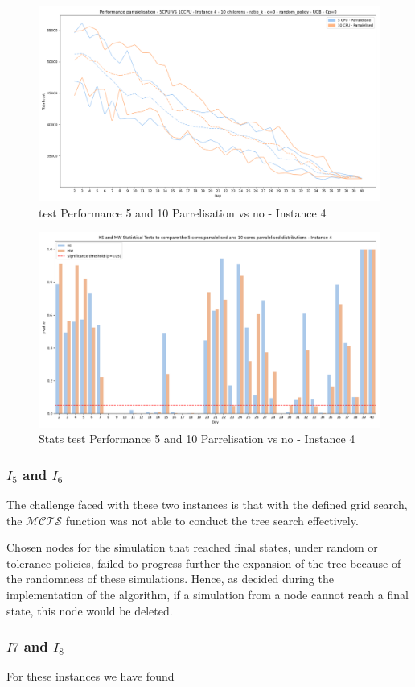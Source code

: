 \begin{figure}[!ht]
    \centering
    \includegraphics[width=\textwidth]{Figures/4 - 5 CPU Paralelised vs 10 CPU paralelised.png}
    \caption{test Performance 5 and 10 Parrelisation vs no - Instance 4}
    \label{fig:parralel (5 vs 10)}
\end{figure}


\begin{figure}[!ht]
    \centering
    \includegraphics[width=\textwidth]{Figures/4 - Distribution stats tests 5P vs 10P.png}
    \caption{Stats test Performance 5 and 10 Parrelisation vs no - Instance 4}
    \label{fig:Stats test 5 VS 10 Parall}
\end{figure}

\newpage
\subsubsection{$I_5$ and $I_6$}

The challenge faced with these two instances is that with the defined grid search, the $\mathcal{MCTS}$ function was not able to conduct the tree search effectively.

Chosen nodes for the simulation that reached final states, under random or tolerance policies, failed to progress further the expansion of the tree because of the randomness of these simulations. Hence, as decided during the implementation of the algorithm, if a simulation from a node cannot reach a final state, this node would be deleted.
\subsubsection{$I7$ and $I_8$}

For these instances we have found
